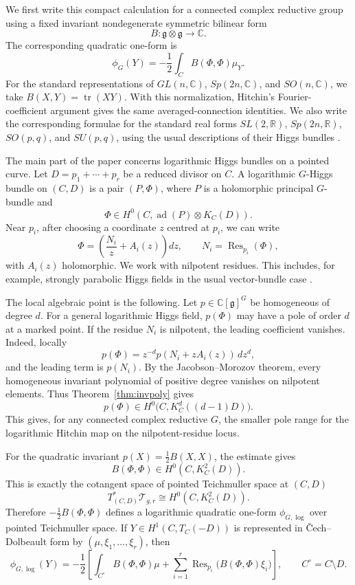 \documentclass[11pt,reqno]{amsart}
\numberwithin{equation}{section}
\theoremstyle{plain}
\theoremstyle{definition}
\theoremstyle{remark}
\begin{document}
We first write this compact calculation for a connected complex reductive group
using a fixed invariant nondegenerate symmetric bilinear form
\[
        B:\mathfrak g\otimes\mathfrak g\longrightarrow\mathbb C.
\]
The corresponding quadratic one-form is
\[
        \phi_G(Y)
        =
        -\frac12\int_C B(\Phi,\Phi)\mu_Y.
\]
For the standard representations of
\(GL(n,\mathbb C)\), \(Sp(2n,\mathbb C)\), and \(SO(n,\mathbb C)\), we take
\(B(X,Y)=\operatorname{tr}(XY)\).  With this normalization, Hitchin's
Fourier-coefficient argument gives the same averaged-connection identities.  We
also write the corresponding formulae for the standard real forms
\(SL(2,\mathbb R)\), \(Sp(2n,\mathbb R)\), \(SO(p,q)\), and \(SU(p,q)\), using
the usual descriptions of their Higgs bundles
\cite{Hitchin1992,GPGM,ABCO,GPR}.

The main part of the paper concerns logarithmic Higgs bundles on a pointed
curve.  Let \(D=p_1+\cdots+p_r\) be a reduced divisor on \(C\).  A logarithmic
\(G\)-Higgs bundle on \((C,D)\) is a pair \((P,\Phi)\), where \(P\) is a
holomorphic principal \(G\)-bundle and
\[
        \Phi\in H^0(C,\operatorname{ad}(P)\otimes K_C(D)).
\]
Near \(p_i\), after choosing a coordinate \(z\) centred at \(p_i\), we can write
\[
        \Phi=
        \left(
        \frac{N_i}{z}+A_i(z)
        \right)dz,
        \qquad
        N_i=\operatorname{Res}_{p_i}(\Phi),
\]
with \(A_i(z)\) holomorphic.  We work with nilpotent residues.  This includes,
for example, strongly parabolic Higgs fields in the usual vector-bundle case
\cite{MehtaSeshadri,Yokogawa,BodenYokogawa}.

The local algebraic point is the following.  Let
\(p\in\mathbb C[\mathfrak g]^G\) be homogeneous of degree \(d\).  For a general
logarithmic Higgs field, \(p(\Phi)\) may have a pole of order \(d\) at a marked
point.  If the residue \(N_i\) is nilpotent, the leading coefficient vanishes.
Indeed, locally
\[
        p(\Phi)=z^{-d}p(N_i+zA_i(z))\,dz^d,
\]
and the leading term is \(p(N_i)\).  By the Jacobson--Morozov theorem, every
homogeneous invariant polynomial of positive degree vanishes on nilpotent
elements.  Thus Theorem~\ref{thm:invpoly} gives
\[
        p(\Phi)\in H^0\bigl(C,K_C^d((d-1)D)\bigr).
\]
This gives, for any connected complex reductive \(G\), the smaller pole range
for the logarithmic Hitchin map on the nilpotent-residue locus.

For the quadratic invariant \(p(X)=\frac12B(X,X)\), the estimate gives
\[
        B(\Phi,\Phi)\in H^0(C,K_C^2(D)).
\]
This is exactly the cotangent space of pointed Teichmuller space at \((C,D)\)
\[
        T^*_{(C,D)}\mathcal T_{g,r}
        \cong
        H^0(C,K_C^2(D)).
\]
Therefore \(-\frac12B(\Phi,\Phi)\) defines a logarithmic quadratic one-form
\(\phi_{G,\log}\) over pointed Teichmuller space.  If
\(Y\in H^1(C,T_C(-D))\) is represented in \v{C}ech--Dolbeault form by
\((\mu,\xi_1,\ldots,\xi_r)\), then
\[
        \phi_{G,\log}(Y)
        =
        -\frac12
        \left[
        \int_{C^\circ}B(\Phi,\Phi)\mu
        +
        \sum_{i=1}^{r}
        \operatorname{Res}_{p_i}
        \bigl(B(\Phi,\Phi)\xi_i\bigr)
        \right],
        \qquad C^\circ=C\setminus D.
\]
\end{document}

